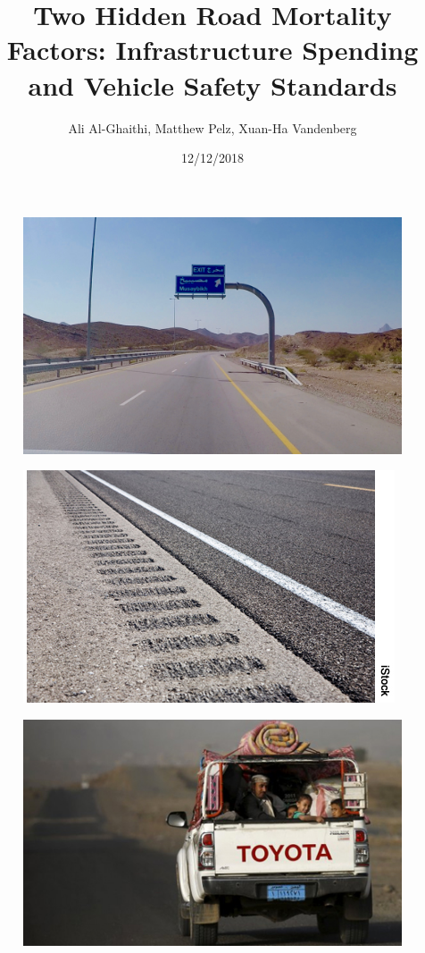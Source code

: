\documentclass[ignorenonframetext,]{beamer}
\title{Two Hidden Road Mortality Factors: Infrastructure Spending and Vehicle
Safety Standards}
\author{Ali Al-Ghaithi, Matthew Pelz, Xuan-Ha Vandenberg}
\date{12/12/2018}
\begin{document}
\frame{\titlepage}

\begin{frame}

\end{frame}

\begin{frame}{}

\begin{figure}
\centering
\includegraphics{Driving-in-oman.jpg}
\caption{}
\end{figure}

\begin{figure}
\centering
\includegraphics{EzZPb.jpg}
\caption{}
\end{figure}

\end{frame}

\begin{frame}{}

\begin{figure}
\centering
\includegraphics{road.jpg}
\caption{}
\end{figure}

\end{frame}
\end{document}
